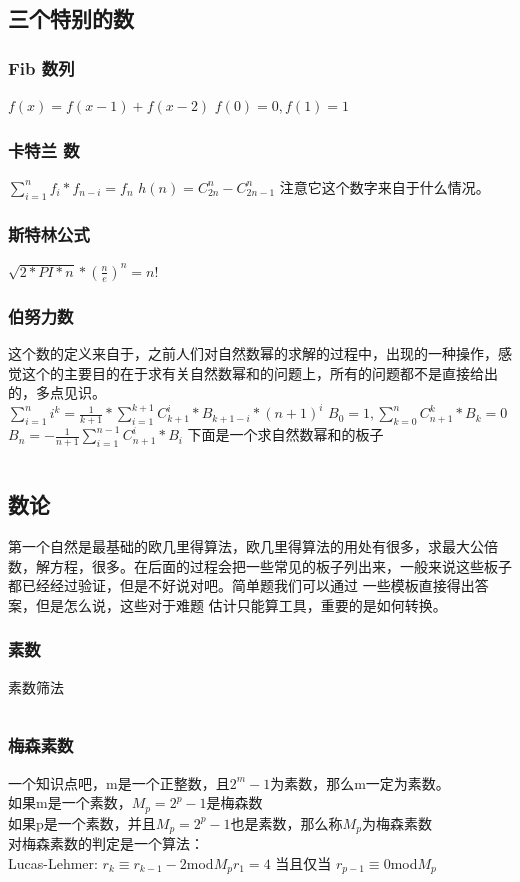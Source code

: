 \documentclass[a4paper,13.6pt]{article}
\begin{document}
\begin{CJK}{UTF8}{gbsn}
\subsection{三个特别的数}
\subsubsection{Fib 数列}
$f(x) = f(x-1)+f(x-2)$ \qquad $f(0) = 0,f(1) = 1$
\subsubsection{卡特兰 数}
$\sum_{i=1}^n f_i*f_{n-i}=f_n$ \qquad
$h(n) = C_{2n}^n - C_{2n-1}^{n}$
注意它这个数字来自于什么情况。
\subsubsection{斯特林公式}
$\sqrt{2*PI*n} * (\frac{n}{e})^n = n!$
\subsubsection{伯努力数}
这个数的定义来自于，之前人们对自然数幂的求解的过程中，出现的一种操作，感觉这个的主要目的在于求有关自然数幂和的问题上，所有的问题都不是直接给出的，多点见识。\\
$\sum_{i=1}^n i^k = \frac{1}{k+1}*\sum_{i = 1}^{k+1}C_{k+1}^i*B_{k+1-i}*(n+1)^i$ \qquad $B_0 = 1,\sum^n_{k = 0}C_{n+1}^k*B_k = 0$ \\ $B_n = -\frac{1}{n+1}\sum_{i=1}^{n-1}C_{n+1}^i*B_i$
下面是一个求自然数幂和的板子
\inputminted{c++}{../scoure/math/bo.cpp}
\subsection{数论}
第一个自然是最基础的欧几里得算法，欧几里得算法的用处有很多，求最大公倍数，解方程，很多。在后面的过程会把一些常见的板子列出来，一般来说这些板子
都已经经过验证，但是不好说对吧。简单题我们可以通过
一些模板直接得出答案，但是怎么说，这些对于难题
估计只能算工具，重要的是如何转换。
\subsubsection{素数}
素数筛法
\inputminted{c++}{../scoure/math/shai.cpp}
\subsubsection{梅森素数}
一个知识点吧，m是一个正整数，且$2^m-1$为素数，那么m一定为素数。\\
如果m是一个素数，$M_p = 2^p-1$是梅森数\\
如果p是一个素数，并且$M_p = 2^p-1$也是素数，那么称$M_p$为梅森素数\\
对梅森素数的判定是一个算法：\\
Lucas-Lehmer:
$r_k \equiv r_{k-1} -2$\quad mod$M_p$\quad $r_1 = 4$
当且仅当 $r_{p-1} \equiv 0$\quad mod$M_p$

\end{CJK}
\end{document}
